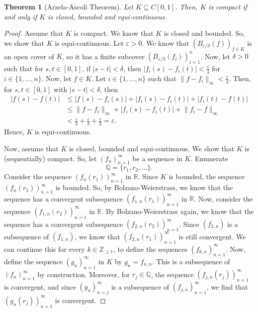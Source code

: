 \documentclass[a4paper, openany]{memoir}
\theoremstyle{definition}
\theoremstyle{plain}
\newtheorem{theorem}[definition]{Theorem}
\begin{document}
    \begin{theorem}[Arzela-Ascoli Theorem]
        Let $K \subseteq C[0, 1]$. Then, $K$ is compact if and only if $K$ is closed, bounded and equi-continuous.
    \end{theorem}
    \begin{proof}
        Assume that $K$ is compact. We know that $K$ is closed and bounded. So, we show that $K$ is equi-continuous. Let $\varepsilon > 0$. We know that $(B_{\varepsilon/3}(f))_{f \in K}$ is an open cover of $K$, so it has a finite subcover $(B_{\varepsilon/3}(f_i))_{i=1}^n$. Now, let $\delta > 0$ such that for $s, t \in [0, 1]$, if $|s - t| < \delta$, then $|f_i(s) - f_i(t)| < \frac{\varepsilon}{3}$ for $i \in \{1, \dots, n\}$. Now, let $f \in K$. Let $i \in \{1, \dots, n\}$ such that $\lVert f - f_i \rVert_\infty < \frac{\varepsilon}{3}$. Then, for $s, t \in [0, 1]$ with $|s - t| < \delta$, then
        \begin{align*}
            |f(s) - f(t)| &\leq |f(s) - f_i(s)| + |f_i(s) - f_i(t)| + |f_i(t) - f(t)| \\
            &\leq \lVert f - f_i \rVert_\infty + |f_i(s) - f_i(t)| + \lVert f_i - f \rVert_\infty \\
            &< \frac{\varepsilon}{3} + \frac{\varepsilon}{3} + \frac{\varepsilon}{3} = \varepsilon.
        \end{align*}
        Hence, $K$ is equi-continuous.

        Now, assume that $K$ is closed, bounded and equi-continuous. We show that $K$ is (sequentially) compact. So, let $(f_n)_{n=1}^\infty$ be a sequence in $K$. Enumerate 
        \[\mathbb{Q} = \{r_1, r_2, \dots\}.\]
        Consider the sequence $(f_n(r_1))_{n=1}^\infty$ in $\mathbb{R}$. Since $K$ is bounded, the sequence $(f_n(r_1))_{n=1}^\infty$ is bounded. So, by Bolzano-Weierstrass, we know that the sequence has a convergent subsequence $(f_{1, n}(r_1))_{n=1}^\infty$ in $\mathbb{R}$. Now, consider the sequence $(f_{1, n}(r_2))_{n=1}^\infty$ in $\mathbb{R}$. By Bolzano-Weierstrass again, we know that the sequence has a convergent subsequence $(f_{2, n}(r_2))_{n=1}^\infty$. Since $(f_{2, n})$ is a subsequence of $(f_{1, n})$, we know that $(f_{2, n}(r_1))_{n=1}^\infty$ is still convergent. We can continue this for every $k \in \mathbb{Z}_{\geq 1}$, to define the sequences $(f_{k, n})_{n=1}^\infty$. Now, define the sequence $(g_n)_{n=1}^\infty$ in $K$ by $g_n = f_{n, n}$. This is a subsequence of $(f_n)_{n=1}^\infty$ by construction. Moreover, for $r_j \in \mathbb{Q}$, the sequence $(f_{j, n}(r_j))_{n=1}^\infty$ is convergent, and since $(g_n)_{n=j}^\infty$ is a subsequence of $(f_{j, n})_{n=1}^\infty$, we find that $(g_n(r_j))_{n=1}^\infty$ is convergent. 


\end{proof}
\end{document}
